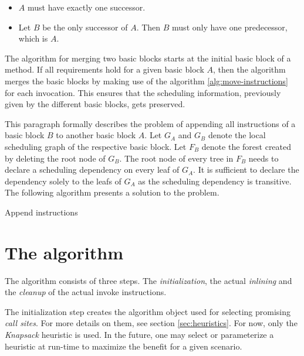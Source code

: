 \documentclass[draft, final]{vutinfth} %
\begin{document}
\begin{itemize}
    \item $A$ must have exactly one successor.
    \item Let $B$ be the only successor of $A$. Then $B$ must only have one predecessor, which is $A$.
\end{itemize}

The algorithm for merging two basic blocks starts at the initial basic block of a method. If all requirements hold for a given basic block $A$, then the algorithm merges the basic blocks by making use of the algorithm \ref{alg:move-instructions} for each invocation. This ensures that the scheduling information, previously given by the different basic blocks, gets preserved.

This paragraph formally describes the problem of appending all instructions of a basic block $B$ to another basic block $A$. Let $G_A$ and $G_B$ denote the local scheduling graph of the respective basic block. Let $F_B$ denote the forest created by deleting the root node of $G_B$. The root node of every tree in $F_B$ needs to declare a scheduling dependency on every leaf of $G_A$. It is sufficient to declare the dependency solely to the leafs of $G_A$ as the scheduling dependency is transitive. The following algorithm presents a solution to the problem.

\begin{algorithm}[H]
\caption{Append instructions}
\label{alg:move-instructions}
\end{algorithm}

\section{The algorithm}
\label{sec:algorithm}

The algorithm consists of three steps. The \emph{initialization}, the actual \emph{inlining} and the \emph{cleanup} of the actual invoke instructions.

The initialization step creates the algorithm object used for selecting promising \emph{call sites}. For more details on them, see section \ref{sec:heuristics}. For now, only the \emph{Knapsack} heuristic is used. In the future, one may select or parameterize a heuristic at run-time to maximize the benefit for a given scenario.
\end{document}
